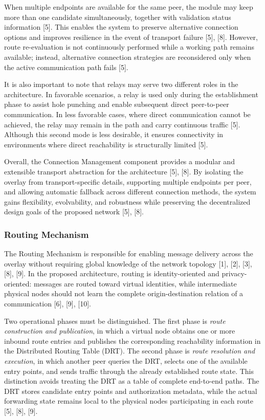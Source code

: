 \documentclass[12pt,a4paper]{article}
\begin{document}
When multiple endpoints are available for the same peer, the module may keep more than one candidate simultaneously, together with validation status information [5]. This enables the system to preserve alternative connection options and improves resilience in the event of transport failure [5], [8]. However, route re-evaluation is not continuously performed while a working path remains available; instead, alternative connection strategies are reconsidered only when the active communication path fails [5].

It is also important to note that relays may serve two different roles in the architecture. In favorable scenarios, a relay is used only during the establishment phase to assist hole punching and enable subsequent direct peer-to-peer communication. In less favorable cases, where direct communication cannot be achieved, the relay may remain in the path and carry continuous traffic [5]. Although this second mode is less desirable, it ensures connectivity in environments where direct reachability is structurally limited [5].

Overall, the Connection Management component provides a modular and extensible transport abstraction for the architecture [5], [8]. By isolating the overlay from transport-specific details, supporting multiple endpoints per peer, and allowing automatic fallback across different connection methods, the system gains flexibility, evolvability, and robustness while preserving the decentralized design goals of the proposed network [5], [8].



\subsubsection{Routing Mechanism}

The Routing Mechanism is responsible for enabling message delivery across the overlay without requiring global knowledge of the network topology [1], [2], [3], [8], [9]. In the proposed architecture, routing is identity-oriented and privacy-oriented: messages are routed toward virtual identities, while intermediate physical nodes should not learn the complete origin-destination relation of a communication [6], [9], [10].

Two operational phases must be distinguished. The first phase is \textit{route construction and publication}, in which a virtual node obtains one or more inbound route entries and publishes the corresponding reachability information in the Distributed Routing Table (DRT). The second phase is \textit{route resolution and execution}, in which another peer queries the DRT, selects one of the available entry points, and sends traffic through the already established route state. This distinction avoids treating the DRT as a table of complete end-to-end paths. The DRT stores candidate entry points and authorization metadata, while the actual forwarding state remains local to the physical nodes participating in each route [5], [8], [9].
\end{document}
